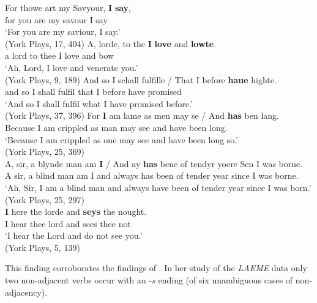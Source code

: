 \documentclass[output=paper]{langsci/langscibook}
\begin{document}
\ea
\label{york1}
\ea \gll For thowe art my Savyour, \textbf{I} \textbf{say},\\
for you are my savour I say \\
\glt `For you are my saviour, I say.'\\
(York Plays, 17, 404)
\ex \gll A, lorde, to the \textbf{I} \textbf{love} and \textbf{lowte}.\\
a lord  to thee I love and bow\\
\glt `Ah, Lord, I love and venerate you.'\\
(York Plays, 9, 189)
\ex \gll And so I schall fulfille / That I before \textbf{haue} highte.\\
and so I shall fulfil {} that I before have promised \\
\glt `And so I shall fulfil what I have promised before.'\\
(York Plays, 37, 396)
\z
\ex\label{york2}
\ea
\gll For \textbf{I} am lame as men may se / And \textbf{has} ben lang. \\
Because I am crippled as man may see and have been long.\\
\glt `Because I am crippled as one may see and have been long so.'\\
(York Plays, 25, 369)\\
\ex \gll A, sir, a blynde man am \textbf{I} / And ay \textbf{has} bene of tendyr yoere Sen
I was borne.\\
A sir, a blind man am I and always has been of tender year since I was borne.\\
\glt `Ah, Sir, I am a blind man and always have been of tender year since I was born.'\\
(York Plays, 25, 297)\\
\ex \gll \textbf{I} here the lorde and \textbf{seys} the nought.\\
I hear thee lord and sees thee not\\
\glt `I hear the Lord and do not see you.'\\
(York Plays, 5, 139)\\
\z
\z

This finding corroborates the findings of \textcite{Fernandez-Cuesta:2011}. In
her study of the \emph{LAEME} data only two non-adjacent \Fsg{} verbs occur
with an -\emph{s} ending (of six unambiguous cases of non-adjacency).
\end{document}
